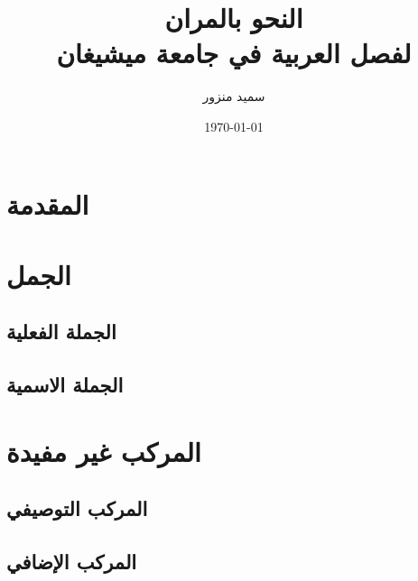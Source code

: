 \documentclass[12pt,twoside]{report}
\title{النحو بالمران\\لفصل العربية في جامعة ميشيغان}
\author{\textarabic{سميد منزور}}
\date{\today} %
\begin{document}
\maketitle
\thispagestyle{empty} %
\tableofcontents

\pagebreak

\chapter{المقدمة}




\chapter{الجمل}



\section{الجملة الفعلية}



\section{الجملة الاسمية}



\chapter{المركب غير مفيدة}



\section{المركب التوصيفي}



\section{المركب الإضافي}


\end{document}
